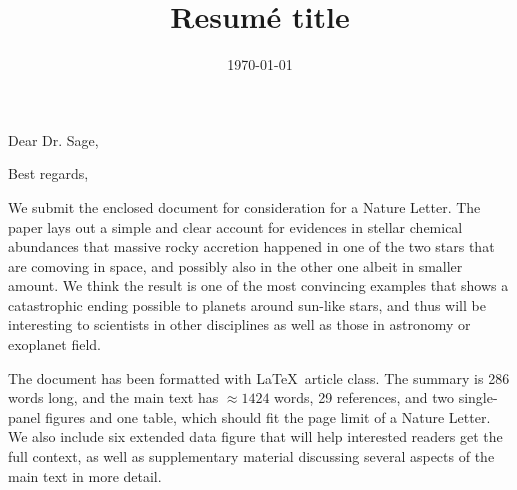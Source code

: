 \documentclass[12pt,letter,roman]{moderncv}
\title{Resumé title}
\begin{document}
\date{\today}
\opening{Dear Dr. Sage,}
\closing{Best regards,}
\makelettertitle

We submit the enclosed document for consideration for a Nature Letter.
The paper lays out a simple and clear account for evidences in stellar
chemical abundances that massive rocky accretion happened in one of the two
stars that are comoving in space, and possibly also in the other one albeit in
smaller amount.
We think the result is one of the most convincing examples that shows a
catastrophic ending possible to planets around sun-like stars, and thus will be
interesting to scientists in other disciplines as well as those in astronomy or
exoplanet field.

The document has been formatted with \LaTeX\ article class.
The summary is 286 words long, and the main text has $\approx 1424$ words,
29 references,
and two single-panel figures and one table, which should fit the page limit
of a Nature Letter.
We also include six extended data figure that will help interested readers
get the full context, as well as supplementary material discussing several
aspects of the main text in more detail.

\vspace{0.5cm}


\makeletterclosing
\end{document}
